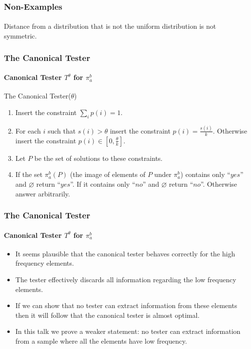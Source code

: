 \documentclass[handout]{beamer}
\begin{document}
\begin{frame}
  \frametitle{Non-Examples} \framesubtitle{}
  \begin{block}{}
    Distance from a distribution that is not the uniform distribution
    is not symmetric.
  \end{block}
\end{frame}


\begin{frame}
  \frametitle{The Canonical Tester} \framesubtitle{Canonical Tester
    $T^\theta$ for $\pi_a^b$}
  \begin{block}{The Canonical Tester($\theta$)}
    \begin{enumerate}
    \item<2-> Insert the constraint $\sum_ip(i)=1$.
    \item<3-> For each $i$ such that $s(i)>\theta$ insert the constraint
      $p(i)=\frac{s(i)}{k}$. Otherwise insert the constraint $p(i)\in
      [0,\frac{\theta}{k}]$.
    \item<4-> Let $P$ be the set of solutions to these constraints.
    \item<5-> If the set $\pi_a^b(P)$ (the image of elements of $P$
      under $\pi_a^b$) contains only ``$yes$'' and $\varnothing$ return
      ``$yes$''. If it contains only ``$no$'' and $\varnothing$ return
      ``$no$''. Otherwise answer arbitrarily.
    \end{enumerate}
  \end{block}
\end{frame}
\begin{frame}
  \frametitle{The Canonical Tester} \framesubtitle{Canonical Tester
    $T^\theta$ for $\pi_a^b$}
  \begin{block}{}
    \begin{itemize}
    \item<1-> It seems plausible that the canonical tester behaves
      correctly for the high frequency elements.
    \item<2-> The tester effectively discards all information
      regarding the low frequency elements.
    \item<3-> If we can show that no tester can extract information from
      these elements then it will follow that the canonical tester is
      almost optimal.
    \item<4-> In this talk we prove a weaker statement: no tester can
      extract information from a sample where all the elements have
      low frequency.
    \end{itemize}
  \end{block}
\end{frame}
\end{document}
